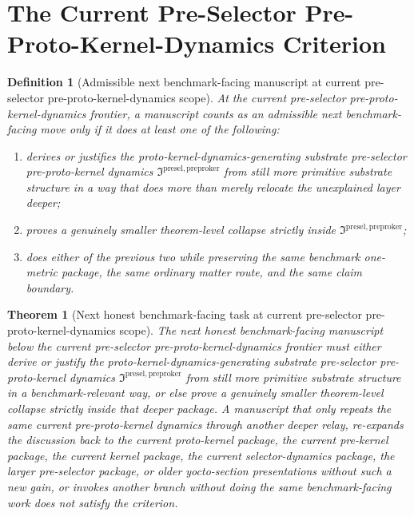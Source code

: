 \documentclass[11pt]{article}
\newcommand{\PreProtoKernelPackage}{\mathfrak I^{\mathrm{presel,preproker}}}
\newtheorem{definition}{Definition}
\newtheorem{theorem}{Theorem}
\begin{document}
\section{The Current Pre-Selector Pre-Proto-Kernel-Dynamics Criterion}

\begin{definition}[Admissible next benchmark-facing manuscript at current pre-selector pre-proto-kernel-dynamics scope]
At the current pre-selector pre-proto-kernel-dynamics frontier, a manuscript counts as an admissible next benchmark-facing move only if it does at least one of the following:
\begin{enumerate}
    \item derives or justifies the proto-kernel-dynamics-generating substrate pre-selector pre-proto-kernel dynamics \(\PreProtoKernelPackage\) from still more primitive substrate structure in a way that does more than merely relocate the unexplained layer deeper;
    \item proves a genuinely smaller theorem-level collapse strictly inside \(\PreProtoKernelPackage\);
    \item does either of the previous two while preserving the same benchmark one-metric package, the same ordinary matter route, and the same claim boundary.
\end{enumerate}
\end{definition}

\begin{theorem}[Next honest benchmark-facing task at current pre-selector pre-proto-kernel-dynamics scope]
The next honest benchmark-facing manuscript below the current pre-selector pre-proto-kernel-dynamics frontier must either derive or justify the proto-kernel-dynamics-generating substrate pre-selector pre-proto-kernel dynamics \(\PreProtoKernelPackage\) from still more primitive substrate structure in a benchmark-relevant way, or else prove a genuinely smaller theorem-level collapse strictly inside that deeper package. A manuscript that only repeats the same current pre-proto-kernel dynamics through another deeper relay, re-expands the discussion back to the current proto-kernel package, the current pre-kernel package, the current kernel package, the current selector-dynamics package, the larger pre-selector package, or older yocto-section presentations without such a new gain, or invokes another branch without doing the same benchmark-facing work does not satisfy the criterion.
\end{theorem}
\end{document}
